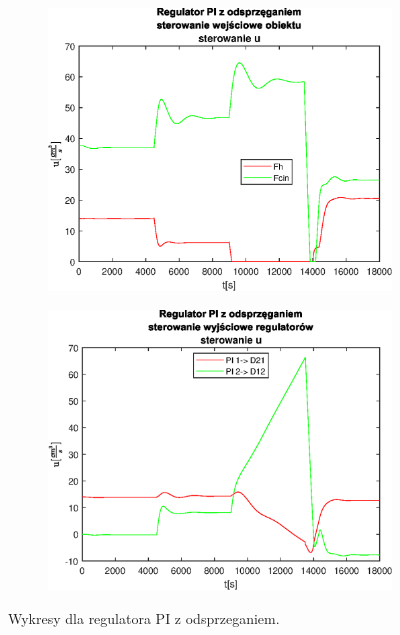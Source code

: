 \begin{figure}[h!]
   \begin{subfigure}[b]{0.4\textwidth}
      \includegraphics[width=1\linewidth]{img/PI/decoupler/noDisturbance/PIDecouplerControl1Linfalse.eps}
      \caption{}
      \label{fig:fig:PIDecoupler1Linfalse3}
   \end{subfigure}
       
   \begin{subfigure}[b]{0.4\textwidth}
      \includegraphics[width=1\linewidth]{img/PI/decoupler/noDisturbance/PIDecouplerControlD1Linfalse.eps}
      \caption{}
      \label{fig:fig:PIDecoupler1Linfalse4}
   \end{subfigure}
       
   \caption{Wykresy dla regulatora PI z odsprzeganiem.}
   \label{fig:PIDecoupler1Linfalse}
\end{figure}
           
